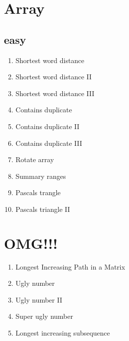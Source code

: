\documentclass[DIV=calc, paper=a4, fontsize=11pt, twocolumn]{scrartcl}	 %
\begin{document}

\section*{Array}
\subsection*{easy}
\begin{enumerate}
\item Shortest word distance \cite{243}
\item Shortest word distance II \cite{244}
\item Shortest word distance III \cite{245}
\item Contains duplicate \cite{217}
\item Contains duplicate II \cite{219}
\item Contains duplicate III \cite{220}
\item Rotate array \cite{189}
\item Summary ranges \cite{228}
\item Pascals trangle \cite{118}
\item Pascals triangle II \cite{119}
\end{enumerate}

\section*{OMG!!!}
\begin{enumerate}
\item Longest Increasing Path in a Matrix
\item Ugly number
\item Ugly number II
\item Super ugly number
\item Longest increasing subsequence
\end{enumerate}


{}

\end{document}
